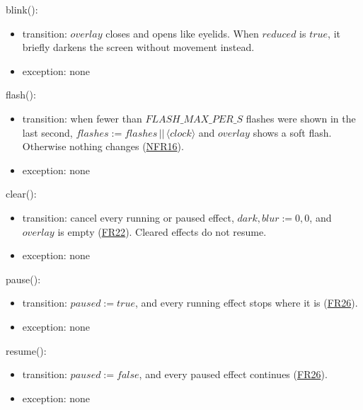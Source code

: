 \documentclass[10pt, titlepage]{article}
\newcommand{\srsurl}{https://team-hindsight.github.io/ophthamology-game/SRS/SRS.pdf}
\newcommand{\srsitemref}[2]{\href{\srsurl\#nameddest=#1}{#2}}
\newcommand{\T}[1]{\mathit{#1}}          %
\newcommand{\true}{\mathit{true}}
\newcommand{\false}{\mathit{false}}
\begin{document}
\begin{samepage}
\noindent blink():
\begin{itemize}
\item transition: $\T{overlay}$ closes and opens like eyelids. When
  $\T{reduced}$ is $\true$, it briefly darkens the screen without movement
  instead.
\item exception: none
\end{itemize}
\end{samepage}
\par\pagebreak[0]

\begin{samepage}
\noindent flash():
\begin{itemize}
\item transition: when fewer than $\T{FLASH\_MAX\_PER\_S}$ flashes were shown
  in the last second, $\T{flashes} := \T{flashes} \,||\, \langle \T{clock}
  \rangle$ and $\T{overlay}$ shows a soft flash. Otherwise nothing changes
  (\srsitemref{NFR_Flashing}{NFR16}).
\item exception: none
\end{itemize}
\end{samepage}
\par\pagebreak[0]

\begin{samepage}
\noindent clear():
\begin{itemize}
\item transition: cancel every running or paused effect,
  $\T{dark}, \T{blur} := 0, 0$, and $\T{overlay}$ is empty
  (\srsitemref{FR_StopOnExit}{FR22}). Cleared effects do not resume.
\item exception: none
\end{itemize}
\end{samepage}
\par\pagebreak[0]

\begin{samepage}
\noindent pause():
\begin{itemize}
\item transition: $\T{paused} := \true$, and every running effect stops where
  it is (\srsitemref{FR_Suspend}{FR26}).
\item exception: none
\end{itemize}
\end{samepage}
\par\pagebreak[0]

\begin{samepage}
\noindent resume():
\begin{itemize}
\item transition: $\T{paused} := \false$, and every paused effect continues
  (\srsitemref{FR_Suspend}{FR26}).
\item exception: none
\end{itemize}
\end{samepage}
\par\pagebreak[0]
\end{document}
